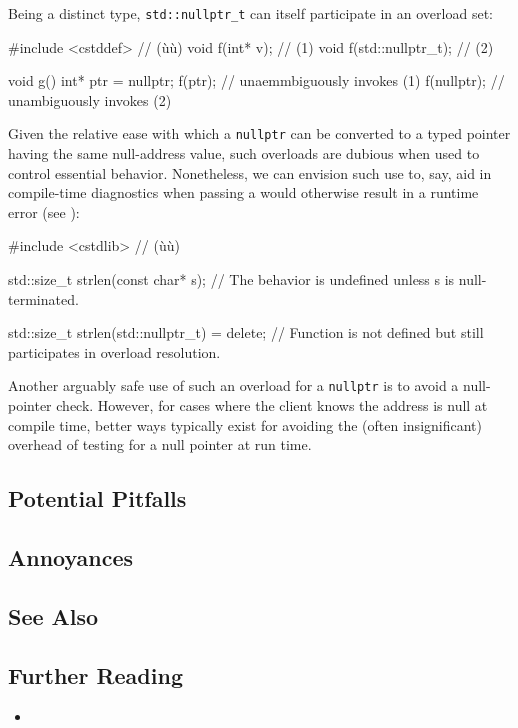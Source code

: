 Being a distinct type, \lstinline!std::nullptr_t! can itself participate
in an overload set:

\begin{emcppslisting}
#include  <cstddef> // (ù{}ù)
void f(int* v);          // (1)
void f(std::nullptr_t);  // (2)

void g()
{
    int* ptr = nullptr;
    f(ptr);      // unaemmbiguously invokes (1)
    f(nullptr);  // unambiguously invokes (2)
}
\end{emcppslisting}


\noindent Given the relative ease with which a \lstinline!nullptr! can be
converted to a typed pointer having the same null-address value, such
overloads are dubious when used to control essential behavior.
Nonetheless, we can envision such use to, say, aid in compile-time
diagnostics when passing a  would otherwise result in
a runtime error (see
):

\begin{emcppshiddenlisting}[emcppsbatch=e4]
#include <cstdlib>  // (ù{}ù)
\end{emcppshiddenlisting}
\begin{emcppslisting}[emcppsbatch=e4]
std::size_t strlen(const char* s);
    // The behavior is undefined unless s is null-terminated.

std::size_t strlen(std::nullptr_t) = delete;
    // Function is not defined but still participates in overload resolution.
\end{emcppslisting}


\noindent Another arguably safe use of such an overload for a \lstinline!nullptr! is
to avoid a null-pointer check. However, for cases where the client knows the address is null at compile time, better ways typically exist for avoiding the (often
insignificant) overhead of testing for a null pointer at run time.

\subsection[Potential Pitfalls]{Potential Pitfalls}\label{potential-pitfalls}

\hspace*{\fill}

\subsection[Annoyances]{Annoyances}\label{annoyances}

\hspace*{\fill}

\subsection[See Also]{See Also}\label{see-also}

\hspace*{\fill}

\subsection[Further Reading]{Further Reading}\label{further-reading}

\begin{itemize}
\item{\cite{meyers15a}}
\end{itemize}

